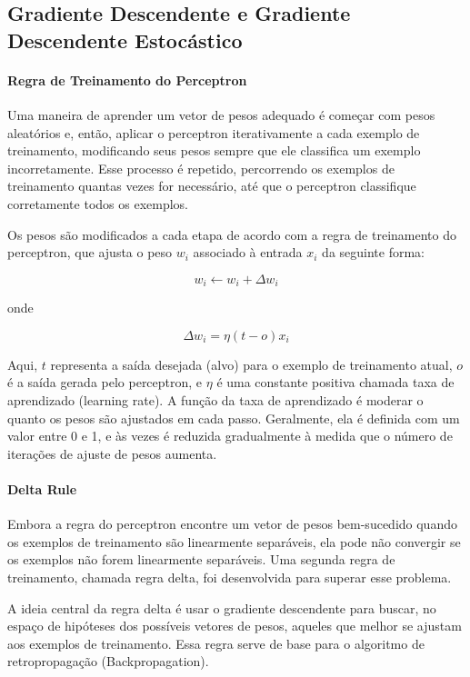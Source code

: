 \documentclass{tufte-handout}
\begin{document}
\subsection{Gradiente Descendente e Gradiente Descendente Estocástico}
\paragraph{Regra de Treinamento do Perceptron}
Uma maneira de aprender um vetor de pesos adequado é começar com pesos aleatórios e, então, aplicar o perceptron iterativamente a cada exemplo de treinamento, modificando seus pesos sempre que ele classifica um exemplo incorretamente. Esse processo é repetido, percorrendo os exemplos de treinamento quantas vezes for necessário, até que o perceptron classifique corretamente todos os exemplos.

Os pesos são modificados a cada etapa de acordo com a regra de treinamento do perceptron, que ajusta o peso $w_i$ associado à entrada $x_i$ da seguinte forma:

\begin{equation}
w_i \leftarrow w_i + \Delta w_i
\end{equation}

onde

\begin{equation}
\Delta w_i = \eta (t - o)x_i
\end{equation}

Aqui, $t$ representa a saída desejada (alvo) para o exemplo de treinamento atual, $o$ é a saída gerada pelo perceptron, e $\eta$ é uma constante positiva chamada taxa de aprendizado (learning rate).
A função da taxa de aprendizado é moderar o quanto os pesos são ajustados em cada passo. Geralmente, ela é definida com um valor entre 0 e 1, e às vezes é reduzida gradualmente à medida que o número de iterações de ajuste de pesos aumenta.

\paragraph{Delta Rule}
Embora a regra do perceptron encontre um vetor de pesos bem-sucedido quando os exemplos de treinamento são linearmente separáveis, ela pode não convergir se os exemplos não forem linearmente separáveis. Uma segunda regra de treinamento, chamada regra delta, foi desenvolvida para superar esse problema.

A ideia central da regra delta é usar o gradiente descendente para buscar, no espaço de hipóteses dos possíveis vetores de pesos, aqueles que melhor se ajustam aos exemplos de treinamento. Essa regra serve de base para o algoritmo de retropropagação (Backpropagation).
\end{document}
